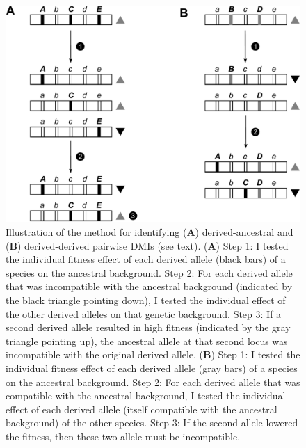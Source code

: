 \begin{doublespace}
\begin{figure}[p]
\begin{center}
\includegraphics[width=5in]{dmi-count-method.pdf}
\end{center}
\caption{Illustration of the method for identifying
  (\textbf{A}) derived-ancestral
  and (\textbf{B}) derived-derived pairwise DMIs (see text).
  (\textbf{A}) Step 1: I tested the individual fitness effect
  of each derived allele (black bars) of a species on the ancestral background.
  Step 2: For each derived allele that
  was incompatible with the ancestral background
  (indicated by the black triangle pointing down),
  I tested the individual effect of the other derived alleles
  on that genetic background.
  Step 3: If a second derived allele resulted in high fitness
  (indicated by the gray triangle pointing up),
  the ancestral allele at that second locus
  was incompatible with the original derived allele.
  (\textbf{B}) Step 1: I tested the individual fitness effect
  of each derived allele (gray bars) of a species on the ancestral background.
  Step 2: For each derived allele that
  was compatible with the ancestral background,
  I tested the individual effect of each derived allele
  (itself compatible with the ancestral background) of the other species.
  Step 3: If the second allele lowered the fitness,
  then these two allele must be incompatible.}
\label{dmi-count-method}
\end{figure}




\end{doublespace}
